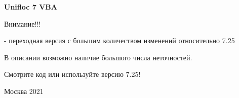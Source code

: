 \thispagestyle{empty}
\begin{center}

\end{center}
%
\vspace{0pt plus4fill} %
%
\vspace{0pt plus6fill} %
\begin{center}
{\large \thesisTitle}
\end{center}
%
\vspace{0pt plus1fill} %
\begin{center}
\textbf {\large %
Unifloc 7 VBA}

\vspace{0pt plus2fill} %
{%

}

\vspace{0pt plus2fill} %
\unf


\end{center}
%
\vspace{0pt plus4fill} %
\begin{flushright}
Внимание!!!

\unf{} - переходная версия с большим количеством изменений относительно 7.25

В описании возможно наличие большого числа неточностей. 

Смотрите код или используйте версию 7.25!

\end{flushright}
%
\vspace{0pt plus4fill} %
{\centering Москва 2021\par}

